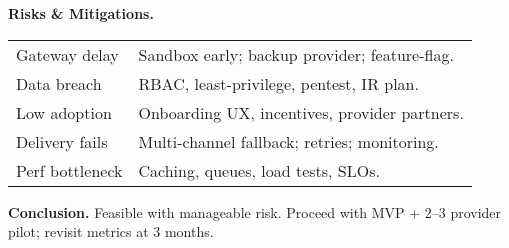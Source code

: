 \documentclass[12pt,a4paper]{article}
\begin{document}
\textbf{Risks \& Mitigations.}
\begin{tabularx}{\textwidth}{@{}lX@{}}
\toprule
Gateway delay & Sandbox early; backup provider; feature-flag. \\
Data breach & RBAC, least-privilege, pentest, IR plan. \\
Low adoption & Onboarding UX, incentives, provider partners. \\
Delivery fails & Multi-channel fallback; retries; monitoring. \\
Perf bottleneck & Caching, queues, load tests, SLOs. \\
\bottomrule
\end{tabularx}

\textbf{Conclusion.} Feasible with manageable risk. Proceed with MVP + 2--3 provider pilot; revisit metrics at 3 months.
\end{document}
